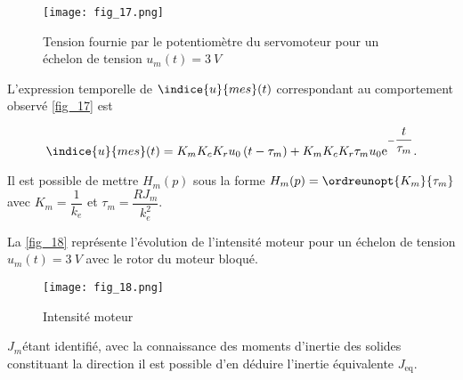 \begin{figure}[H]
\centering
\texttt{[image: fig\_17.png]}
\caption{Tension fournie par le potentiomètre du servomoteur pour un échelon de tension $u_m(t)=\SI{3}{V}$ \label{fig_17}}
\end{figure}

L’expression temporelle de $\indice{u}{mes}(t)$ correspondant au comportement observé \autoref{fig_17} est

$$\indice{u}{mes}(t) = K_m K_c K_r u_0\left(t-\tau_m\right)+K_m K_c K_r\tau_m u_0 \text{e}^{-\dfrac{t}{\tau_m}}.$$

Il est possible de mettre $H_m(p)$ sous la forme $H_m(p) = \ordreunopt{K_m}{\tau_m}$
avec $K_m = \dfrac{1}{k_e}$ et $\tau_m =\dfrac{R J_m}{k_e^2}$.

\ifprof
\begin{corrige}
\end{corrige}
\else
\fi

\ifprof
\begin{corrige}
\end{corrige}
\else
\fi

La \autoref{fig_18} représente l’évolution de l’intensité moteur pour un échelon de tension $u_m(t)=\SI{3}{V}$ avec le rotor du moteur bloqué.

\begin{figure}[H]
\centering
\texttt{[image: fig\_18.png]}
\caption{Intensité moteur\label{fig_18}}
\end{figure}

\ifprof
\begin{corrige}
\end{corrige}
\else
\fi

\ifprof
\begin{corrige}
\end{corrige}
\else
\fi

$J_m$étant identifié, avec la connaissance des moments d’inertie des solides constituant la direction il est possible
d’en déduire l’inertie équivalente $J_{\text{eq}}$.

